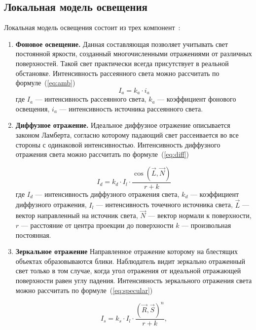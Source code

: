 \subsection{Локальная модель освещения}
Локальная модель освещения состоит из трех компонент~\cite{Phong1975}:

\begin{enumerate}[label=\arabic*)]
	\item \textbf{Фоновое освещение.} Данная составляющая позволяет учитывать свет постоянной яркости, созданный многочисленными отражениями от различных поверхностей. Такой свет практически всегда присутствует в реальной обстановке. Интенсивность  рассеянного света можно рассчитать по формуле~(\ref{eq:amb})
	\begin{equation}\label{eq:amb}
		I_{a} = k_{a} \cdot i_{a}
	\end{equation}
	\noindent где 
	$I_{a}$ --- интенсивность рассеянного света, 
	$k_{a}$ --- коэффициент фонового освещения, 
	$i_{a}$ --- интенсивность источника рассеянного света. 
	
	\item \textbf{Диффузное отражение.} Идеальное диффузное отражение описывается законом Ламберта, согласно которому падающий свет рассеивается во все стороны с одинаковой интенсивностью. Интенсивность диффузного отражения света можно рассчитать по формуле~(\ref{eq:diff})
	
	\begin{equation}\label{eq:diff}
		I_{d} = k_{d} \cdot I_{l} \cdot \frac{\cos(\overrightarrow{L}, \overrightarrow{N})}{r + k}
	\end{equation}
	\noindent где 
	$I_{d}$ --- интенсивность диффузного отражения света, 
	$k_{d}$ --- коэффициент диффузного отражения, 
	$I_{l}$ --- интенсивность точечного источника света,
	$\overrightarrow{L}$ --- вектор направленный на источник света, 
	$\overrightarrow{N}$ --- вектор нормали к поверхности,
	$r$ --- расстояние от центра проекции до поверхности
	$k$ --- произвольная постоянная.
	
	\item \textbf{Зеркальное отражение} Направленное отражение которому на блестящих объектах образовываются блики. Наблюдатель видит зеркально отраженный свет только в том случае, когда угол отражения от идеальной отражающей поверхности равен углу падения. Интенсивность зеркального отражения света можно рассчитать по формуле~(\ref{eq:specular})
	
	\begin{equation}\label{eq:specular}
		I_{s} = k_{s} \cdot I_{l} \cdot \frac{(\overrightarrow{R}, \overrightarrow{S})^n}{r + k},
	\end{equation}
	

\end{enumerate}
